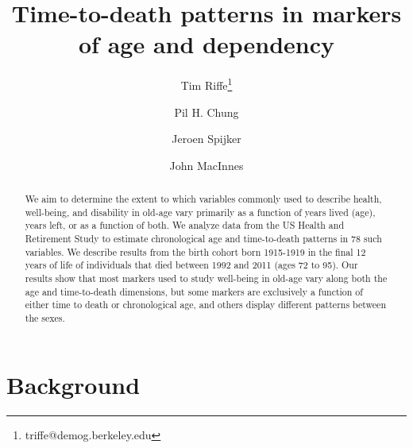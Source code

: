 \documentclass{article}
\begin{document}
\title{Time-to-death patterns in markers of age and dependency}

\author[1]{Tim Riffe\thanks{triffe@demog.berkeley.edu}}
\author[1]{Pil H. Chung}
\author[2,3]{Jeroen Spijker}
\author[4]{John MacInnes}

\maketitle

\begin{abstract}
We aim to determine the extent to which variables commonly
used to describe health, well-being, and disability in old-age vary primarily
as a function of years lived (age), years left, or as a function of both. We analyze data from the US Health and Retirement Study to estimate
chronological age and time-to-death patterns in 78 such variables. We describe
results from the birth cohort born 1915-1919 in the final 12 years of life of
individuals that died between 1992 and 2011 (ages 72 to 95). Our results show
that most markers used to study well-being in old-age vary along both the age
and time-to-death dimensions, but some markers are exclusively a function of
either time to death or chronological age, and others display different patterns
between the sexes.
\end{abstract}

\section*{Background}
\end{document}
